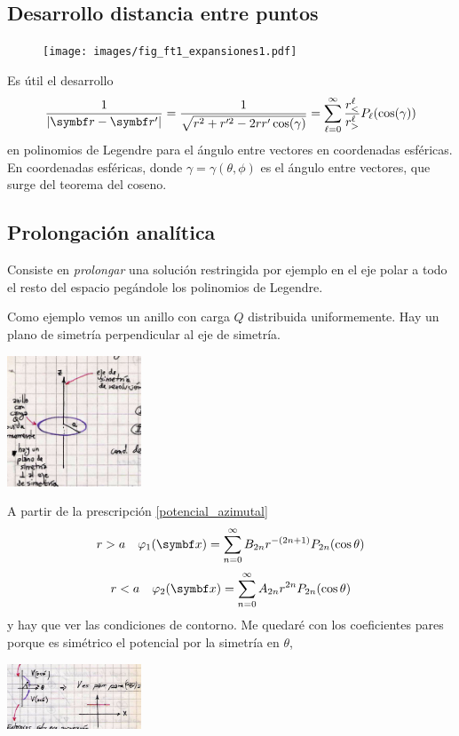 \documentclass[10pt,oneside]{CBFT_book}
\begin{document}
\subsection{Desarrollo distancia entre puntos}

\begin{figure}[thb]
	\begin{center}
	\texttt{[image: images/fig\_ft1\_expansiones1.pdf]}	 
	\end{center}
	\caption{}
\end{figure} 

Es útil el desarrollo
\[
	\frac{1}{|\vb{r} - \vb{r}'|} = \frac{1}{\sqrt{r^2 + r'^2 -2rr'\cos(\gamma)}}
	= \sum_{\ell=0}^\infty \frac{r^\ell_{<}}{r^\ell_{>}} P_\ell (\cos(\gamma))
\]
en polinomios de Legendre para el ángulo entre vectores en coordenadas esféricas.
En coordenadas esféricas, donde $\gamma=\gamma(\theta,\phi)$ es el ángulo entre vectores,
que surge del teorema del coseno.

\subsection{Prolongación analítica}

Consiste en {\it prolongar} una solución restringida por ejemplo en el eje polar a todo el
resto del espacio pegándole los polinomios de Legendre.

Como ejemplo vemos un anillo con carga $Q$ distribuida uniformemente. Hay un plano
de simetría perpendicular al eje de simetría.

\includegraphics[width=0.3\textwidth]{images/fig_ft1_prolongacion_A.jpg}

A partir de la prescripción \eqref{potencial_azimutal}
\[
	r > a \quad \vp_1(\vbx) = \sum_{n=0}^{\infty} B_{2n} r^{-(2n+1)} P_{2n}( \cos\theta )
\]
\[
	r < a \quad \vp_2(\vbx) = \sum_{n=0}^{\infty} A_{2n} r^{2n} P_{2n}( \cos\theta )
\]
y hay que ver las condiciones de contorno. Me quedaré con los coeficientes
pares porque es simétrico el potencial por la simetría en $\theta$,

\includegraphics[width=0.3\textwidth]{images/fig_ft1_prolongacion_B.jpg}
\end{document}
